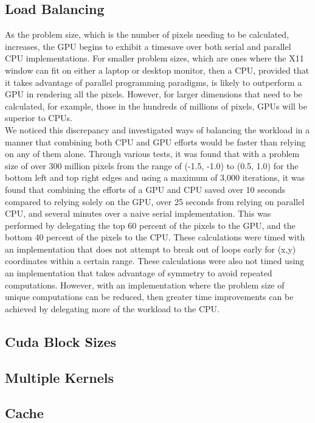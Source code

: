 \documentclass{article}
\begin{document}
\subsection{Load Balancing}

As the problem size, which is the number of pixels needing to be calculated, increases, the GPU begins to exhibit a timesave over both serial and parallel CPU implementations. For smaller problem sizes, which are ones where the X11 window can fit on either a laptop or desktop monitor, then a CPU, provided that it takes advantage of parallel programming paradigms, is likely to outperform a GPU in rendering all the pixels. However, for larger dimensions that need to be calculated, for example, those in the hundreds of millions of pixels, GPUs will be superior to CPUs.\\

We noticed this discrepancy and investigated ways of balancing the workload in a manner that combining both CPU and GPU efforts would be faster than relying on any of them alone. Through various tests, it was found that with a problem size of over 300 million pixels from the range of (-1.5, -1.0) to (0.5, 1.0) for the bottom left and top right edges and using a maximum of 3,000 iterations, it was found that combining the efforts of a GPU and CPU saved over 10 seconds compared to relying solely on the GPU, over 25 seconds from relying on parallel CPU, and several minutes over a naive serial implementation. This was performed by delegating the top 60 percent of the pixels to the GPU, and the bottom 40 percent of the pixels to the CPU. These calculations were timed with an implementation that does not attempt to break out of loops early for (x,y) coordinates within a certain range. These calculations were also not timed using an implementation that takes advantage of symmetry to avoid repeated computations. However, with an implementation where the problem size of unique computations can be reduced, then greater time improvements can be achieved by delegating more of the workload to the CPU.

\subsection{Cuda Block Sizes}

\subsection{Multiple Kernels}

\subsection{Cache}
\end{document}
